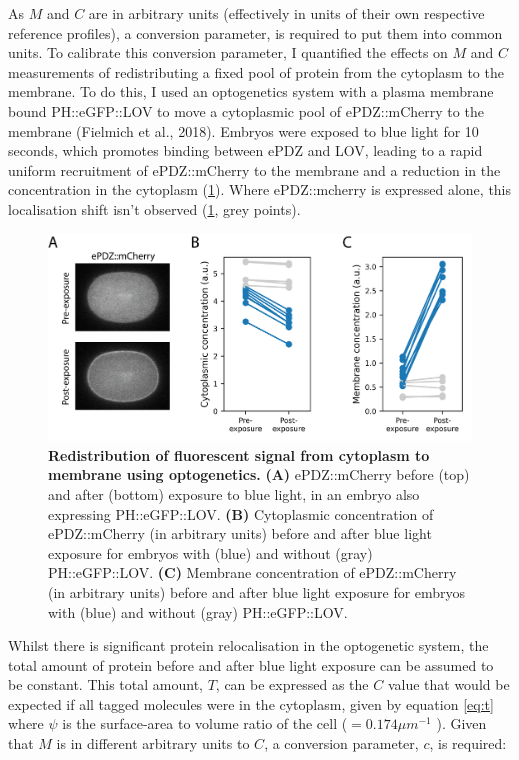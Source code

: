 \documentclass[12pt]{"report"}
\newcommand{\mycaption}[2]{\caption[#1]{\textbf{#1.} #2}}
\begin{document}
As $M$ and $C$ are in arbitrary units (effectively in units of their own respective reference profiles), a conversion parameter, is required to put them into common units. To calibrate this conversion parameter, I quantified the effects on $M$ and $C$ measurements of redistributing a fixed pool of protein from the cytoplasm to the membrane. To do this, I used an optogenetics system with a plasma membrane bound PH::eGFP::LOV to move a cytoplasmic pool of ePDZ::mCherry to the membrane (Fielmich et al., 2018). Embryos were exposed to blue light for 10 seconds, which promotes binding between ePDZ and LOV, leading to a rapid uniform recruitment of ePDZ::mCherry to the membrane and a reduction in the concentration in the cytoplasm (\cref{fig:memquant_optogenetics}). Where ePDZ::mcherry is expressed alone, this localisation shift isn't observed (\cref{fig:memquant_optogenetics}, grey points).\\

\begin{figure}
\includegraphics[scale=1]{memquant_optogenetics}
\centering
\mycaption{Redistribution of fluorescent signal from cytoplasm to membrane using optogenetics}{
\textbf{(A)} ePDZ::mCherry before (top) and after (bottom) exposure to blue light, in an embryo also expressing PH::eGFP::LOV.
\textbf{(B)} Cytoplasmic concentration of ePDZ::mCherry (in arbitrary units) before and after blue light exposure for embryos with (blue) and without (gray) PH::eGFP::LOV. 
\textbf{(C)} Membrane concentration of ePDZ::mCherry (in arbitrary units) before and after blue light exposure for embryos with (blue) and without (gray) PH::eGFP::LOV. 
}
\label{fig:memquant_optogenetics}
\end{figure}

Whilst there is significant protein relocalisation in the optogenetic system, the total amount of protein before and after blue light exposure can be assumed to be constant. This total amount, $T$, can be expressed as the $C$ value that would be expected if all tagged molecules were in the cytoplasm, given by equation \ref{eq:t} where $\psi$ is the surface-area to volume ratio of the cell ($= 0.174 \mu m ^ {-1}$ \citep{Goehring2011a}). Given that $M$ is in different arbitrary units to $C$, a conversion parameter, $c$, is required:
\end{document}
